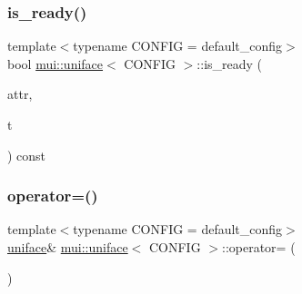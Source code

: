 \mbox{\label{classmui_1_1uniface_a5c3b0f69a64e78c505500d26cb222a57}} 
\subsubsection{\texorpdfstring{is\+\_\+ready()}{is\_ready()}}
{\footnotesize\ttfamily template$<$typename C\+O\+N\+F\+IG  = default\+\_\+config$>$ \\
bool \hyperlink{classmui_1_1uniface}{mui\+::uniface}$<$ C\+O\+N\+F\+IG $>$\+::is\+\_\+ready (\begin{DoxyParamCaption}\item[{const std\+::string \&}]{attr,  }\item[{\hyperlink{classmui_1_1uniface_a65cbecf1936d7d61cb45f14b1138dc07}{time\+\_\+type}}]{t }\end{DoxyParamCaption}) const\hspace{0.3cm}{\ttfamily [inline]}}

\mbox{\label{classmui_1_1uniface_a9452cc41125184ca4088d7c1b3b93ad1}} 
\subsubsection{\texorpdfstring{operator=()}{operator=()}}
{\footnotesize\ttfamily template$<$typename C\+O\+N\+F\+IG  = default\+\_\+config$>$ \\
\hyperlink{classmui_1_1uniface}{uniface}\& \hyperlink{classmui_1_1uniface}{mui\+::uniface}$<$ C\+O\+N\+F\+IG $>$\+::operator= (\begin{DoxyParamCaption}\item[{const \hyperlink{classmui_1_1uniface}{uniface}$<$ C\+O\+N\+F\+IG $>$ \&}]{ }\end{DoxyParamCaption})\hspace{0.3cm}{\ttfamily [delete]}}

\mbox{\label{classmui_1_1uniface_a054a9fe331fe008bb5910493d6a1bec3}} 
